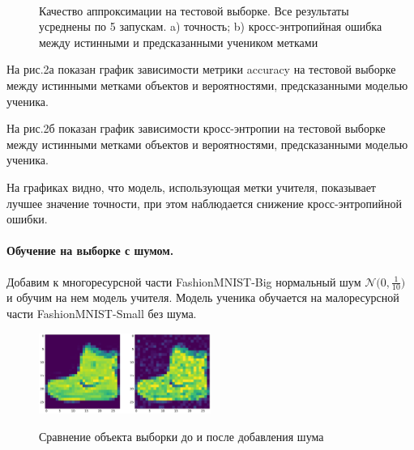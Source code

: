\begin{figure}[h!t]\center
{}
\\
\caption{Качество аппроксимации на тестовой выборке. Все результаты усреднены по 5 запускам. a) точность; b) кросс-энтропийная ошибка между истинными и предсказанными учеником метками}
\end{figure}

На рис.2а показан график зависимости метрики accuracy на тестовой выборке между истинными метками объектов и вероятностями, предсказанными моделью ученика.

На рис.2б показан график зависимости кросс-энтропии на тестовой выборке между истинными метками объектов и вероятностями, предсказанными моделью ученика.

На графиках видно, что модель, использующая метки учителя, показывает лучшее значение точности, при этом наблюдается снижение кросс-энтропийной ошибки.

\newpage
\paragraph{Обучение на выборке с шумом.}
Добавим к многоресурсной части FashionMNIST-Big нормальный шум $\mathcal{N}\bigr(0,\frac{1}{10}\bigr)$ и обучим на нем модель учителя. Модель ученика обучается на малоресурсной части FashionMNIST-Small без шума.

\begin{figure}[h!t]\center
{\includegraphics[width=0.5\textwidth]{results/noise}}
\caption{Сравнение объекта выборки до и после добавления шума}
\end{figure}\\

